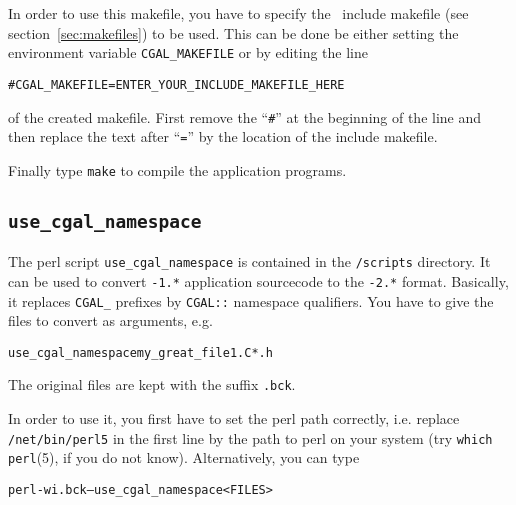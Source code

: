 In order to use this makefile, you have to specify the \cgal\ include
makefile (see section~\ref{sec:makefiles}) to be used. This can be
done be either setting the environment variable
\texttt{CGAL\_MAKEFILE} or by editing the line
\begin{alltt}
  # CGAL_MAKEFILE = ENTER_YOUR_INCLUDE_MAKEFILE_HERE
\end{alltt}
of the created makefile. First remove the ``\texttt{\#}'' at the
beginning of the line and then replace the text after ``\texttt{=}''
by the location of the include makefile. 

Finally type \texttt{make} to compile the application programs.

\subsection{\texttt{use\_cgal\_namespace}}\label{sec:use_cgal_namespace}

The perl script \texttt{use\_cgal\_namespace} is contained in the
\cgaldir\texttt{/scripts} directory. It can be used to convert
\cgal\texttt{-1.*} application sourcecode to the \cgal\texttt{-2.*}
format.  Basically, it replaces \texttt{CGAL\_} prefixes by
\texttt{CGAL::} namespace qualifiers. You have to give the files to
convert as arguments, e.g.
\begin{alltt}
  use_cgal_namespace my_great_file1.C *.h
\end{alltt}
The original files are kept with the suffix \texttt{.bck}.

In order to use it, you first have to set the perl path correctly,
i.e. replace \texttt{/net/bin/perl5} in the first line by the path to
perl on your system (try \texttt{which perl}(5), if you do not know).
Alternatively, you can type
\begin{alltt}
  perl -wi.bck -- use_cgal_namespace <FILES>
\end{alltt}

\lcTex{\end{appendix}}



